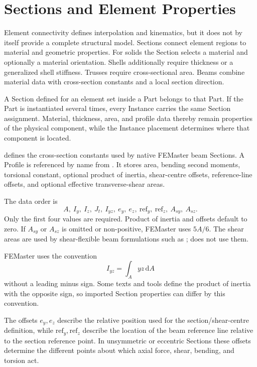 \chapter{Sections and Element Properties}
\label{chap:sections}

Element connectivity defines interpolation and kinematics, but it does not by itself provide a complete structural model. Sections connect element regions to material and geometric properties. For solids the Section selects a material and optionally a material orientation. Shells additionally require thickness or a generalized shell stiffness. Trusses require cross-sectional area. Beams combine material data with cross-section constants and a local section direction.

A Section defined for an element set inside a Part belongs to that Part. If the Part is instantiated several times, every Instance carries the same Section assignment. Material, thickness, area, and profile data thereby remain properties of the physical component, while the Instance placement determines where that component is located.


 defines the cross-section constants used by native FEMaster beam Sections. A Profile is referenced by name from . It stores area, bending second moments, torsional constant, optional product of inertia, shear-centre offsets, reference-line offsets, and optional effective transverse-shear areas.

The data order is
\[
A,\ I_y,\ I_z,\ J_t,\ I_{yz},\ e_y,\ e_z,\ \mathrm{ref}_y,\ \mathrm{ref}_z,\ A_{sy},\ A_{sz}.
\]
Only the first four values are required. Product of inertia and offsets default to zero. If \(A_{sy}\) or \(A_{sz}\) is omitted or non-positive, FEMaster uses \(5A/6\). The shear areas are used by shear-flexible beam formulations such as ;  does not use them.

FEMaster uses the convention
\[
I_{yz}=\int_A yz\,\mathrm dA
\]
without a leading minus sign. Some texts and tools define the product of inertia with the opposite sign, so imported Section properties can differ by this convention.

The offsets \(e_y,e_z\) describe the relative position used for the section/shear-centre definition, while \(\mathrm{ref}_y,\mathrm{ref}_z\) describe the location of the beam reference line relative to the section reference point. In unsymmetric or eccentric Sections these offsets determine the different points about which axial force, shear, bending, and torsion act.

